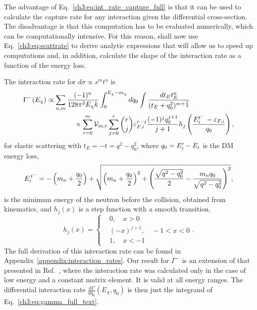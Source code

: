 The advantage of Eq.~\ref{ch3:eq:int_rate_capture_full} is that it can be used to calculate the capture rate for any interaction given the differential cross-section. The disadvantage is that this computation has to be evaluated numerically, which can be computationally intensive. For this reason, shall now use Eq.~\ref{ch3:eq:scattrate} to derive analytic expressions that will allow us to speed up computations and, in addition, calculate the shape of the interaction rate as a function of the energy loss. 

The interaction rate for $d\sigma \propto s^m t^n$ is 
\begin{equation}
    \begin{split}
        \Gamma^{-}(E_\chi) & \propto \sum_{n,m}  \frac{(-1)^n }{128\pi^3 E_\chi k }\int_0^{E_\chi -m_\chi} dq_0\int \frac{dt_E t_E^n}{(t_E + q_0^2)^{m+\frac{1}{2}}}\\
        &\hspace{4em}\times\sum_{r=0}^m \mathcal{V}_{m,r}\sum_{j = 0}^r\binom{r}{j} \varepsilon_{F,i}^{r-j}  \frac{(-1)^{j} q_0^{j+1}}{j+1} h_j\left( \frac{E_i^{t^-} - \varepsilon_{F,i}}{q_0}\right),
    \end{split}
    \label{ch3:eq:gamma_full_text}
\end{equation}
for elastic scattering with $t_E=-t=q^2-q_0^2$, where $q_0=E_i'-E_i$ is the DM energy loss, 
\begin{equation}
E_i^{\, t^{-}} = -\left(m_n+\frac{q_0}{2}\right) + \sqrt{\left(m_n+\frac{q_0}{2}\right)^2+\left(\frac{\sqrt{q^2-q_0^2}}{2}-\frac{m_n q_0}{\sqrt{q^2-q_0^2}}\right)^2}, 
\label{ch3:eq:Etm_def}
\end{equation}
is the minimum energy of the neutron before the collision, obtained from kinematics,  and $h_j(x)$ is a step function with a smooth transition, 
\begin{equation}
    h_j(x) = \begin{cases}
        & 0, \quad x >0\\
        & (-x)^{j+1},\quad -1<x <0\\
        & 1,\quad x<-1
    \end{cases}.
    \label{ch3:eq:h_stepfn}
\end{equation}
The full derivation of this interaction rate can be found in Appendix~\ref{appendix:interaction_rates}. 
Our result for $\Gamma^-$ is an extension of that presented in Ref.~\cite{Bertoni:2013bsa_dec_DarkMatterThermalization}, where the interaction rate was calculated only in the case of low energy and a constant matrix element. It is valid at all energy ranges.
The differential interaction rate $\frac{d\Gamma}{d q_0}(E_\chi,q_0)$ is then just the integrand of Eq.~\ref{ch3:eq:gamma_full_text}.



